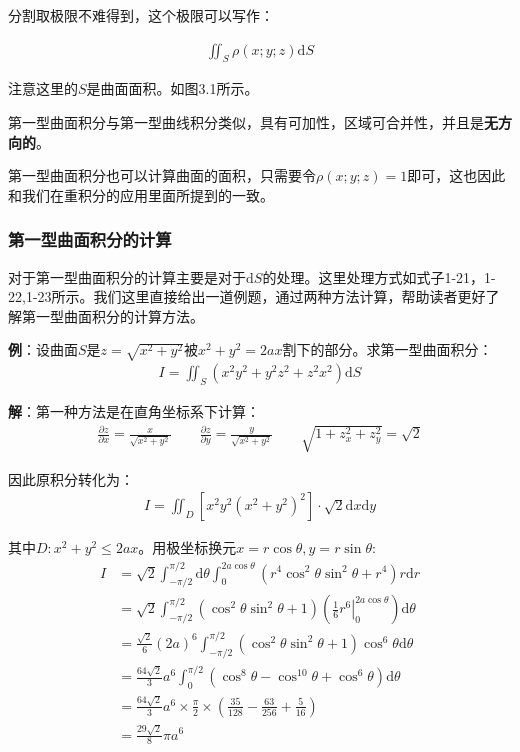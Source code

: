 \documentclass{ctexart}
\let\oldtextbf\textbf
\renewcommand{\textbf}[1]{\textcolor{brown!50!red}{\oldtextbf{#1}}}
\begin{document}
分割取极限不难得到，这个极限可以写作：

\begin{align*}
\iint_S \rho(x;y;z)\mathrm{d}S\tag{3-1}  
\end{align*}

注意这里的$S$是曲面面积。如图3.1所示。

第一型曲面积分与第一型曲线积分类似，具有可加性，区域可合并性，并且是\textbf{\color{brown!50!red}无方向的}。

第一型曲面积分也可以计算曲面的面积，只需要令$\rho(x;y;z)=1$即可，这也因此和我们在重积分的应用里面所提到的一致。

\subsubsection{第一型曲面积分的计算}
对于第一型曲面积分的计算主要是对于$\mathrm{d}S$的处理。这里处理方式如式子1-21，1-22,1-23所示。我们这里直接给出一道例题，通过两种方法计算，帮助读者更好了解第一型曲面积分的计算方法。

\textbf{例}：设曲面$S$是$z=\sqrt{x^2+y^2}$被$x^2+y^2=2ax$割下的部分。求第一型曲面积分：
\begin{align*}
    I=\iint_S(x^2y^2+y^2z^2+z^2x^2)\mathrm{d}S
\end{align*}

\textbf{解}：第一种方法是在直角坐标系下计算：
\begin{align*}
    \frac{\partial z}{\partial x}=\frac{x}{\sqrt{x^2+y^2}}\qquad \frac{\partial z}{\partial y}=\frac{y}{\sqrt{x^2+y^2}}\qquad \sqrt{1+z_x^2+z_y^2}=\sqrt{2}
\end{align*}

因此原积分转化为：
\begin{align*}
I=\iint_D[x^2y^2(x^2+y^2)^2]\cdot\sqrt{2}\mathrm{d}x\mathrm{d}y
\end{align*}

其中$D:x^2+y^2\leq 2ax$。用极坐标换元$x=r\cos\theta,y=r\sin\theta$:
\begin{align*}
I&=\sqrt{2}\int_{-\pi/2}^{\pi/2}\mathrm{d}\theta\int_0^{2a\cos\theta}(r^4\cos^2\theta\sin^2\theta+r^4)r\mathrm{d}r\\
&=  \sqrt{2}\int_{-\pi/2}^{\pi/2}(\cos^2\theta\sin^2\theta+1)(\left.\frac{1}{6}r^6\right|_0^{2a\cos\theta})\mathrm{d}\theta\\
&=\frac{\sqrt{2}}{6}(2a)^6\int_{-\pi/2}^{\pi/2}(\cos^2\theta\sin^2\theta+1)\cos^6\theta\mathrm{d}\theta\\
&=\frac{64\sqrt{2}}{3}a^6\int_0^{\pi/2}(\cos^8\theta-\cos^{10}\theta+\cos^6\theta)\mathrm{d}\theta\\
&=\frac{64\sqrt{2}}{3}a^6\times\frac{\pi}{2}\times(\frac{35}{128}-\frac{63}{256}+\frac{5}{16})\\
&=\frac{29\sqrt{2}}{8}\pi a^6
\end{align*}
\end{document}
